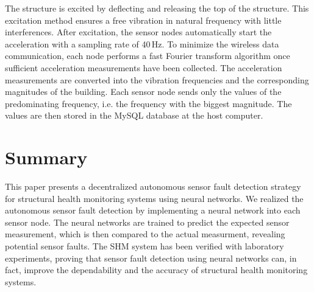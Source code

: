 \documentclass[12pt,a4paper]{scrartcl}
\begin{document}
The structure is excited by deflecting and releasing the top of the structure.
This excitation method ensures a free vibration in natural frequency with little interferences.
After excitation, the sensor nodes automatically start the acceleration with a sampling rate of 40\,Hz.
To minimize the wireless data communication, each node performs a fast Fourier transform algorithm once sufficient acceleration measurements have been collected.
The acceleration measurements are converted into the vibration frequencies and the corresponding magnitudes of the building.
Each sensor node sends only the values of the predominating frequency, i.e. the frequency with the biggest magnitude.
The values are then stored in the MySQL database at the host computer.



%
%
%


\section*{Summary}

This paper presents a decentralized autonomous sensor fault detection strategy for structural health monitoring systems using neural networks. 
We realized the autonomous sensor fault detection by implementing a neural network into each sensor node.
The neural networks are trained to predict the expected sensor measurement, which is then compared to the actual measurment, revealing potential sensor faults.
The SHM system has been verified with laboratory experiments, proving that sensor fault detection using neural networks can, in fact, improve the dependability and the accuracy of structural health monitoring systems.




\end{document}
